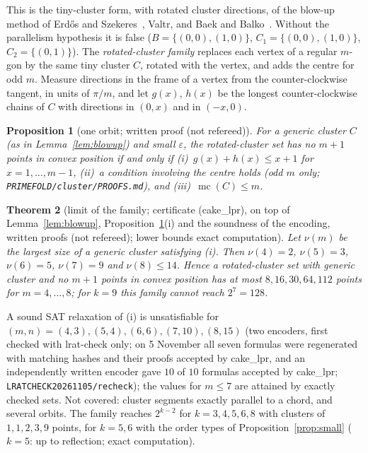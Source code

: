 \documentclass[10pt]{article}
\newtheorem{theorem}{Theorem}[section]
\newtheorem{proposition}[theorem]{Proposition}
\theoremstyle{definition}
\theoremstyle{remark}
\newcommand{\mc}{\operatorname{mc}}
\newcommand{\dirn}[1]{{\upshape\nolinkurl{#1}}}
\begin{document}
This is the tiny-cluster form, with rotated cluster directions, of the blow-up method of Erd\H{o}s and
Szekeres~\cite{ES61}, Valtr, and Baek and Balko~\cite{BB25}. Without the parallelism hypothesis it is false
($B=\{(0,0),(1,0)\}$, $C_1=\{(0,0),(1,0)\}$, $C_2=\{(0,1)\}$). The \emph{rotated-cluster family} replaces each vertex of a
regular $m$-gon by the same tiny cluster $C$, rotated with the vertex, and adds the centre for odd $m$. Measure
directions in the frame of a vertex from the counter-clockwise tangent, in units of $\pi/m$, and let $g(x)$, $h(x)$ be the
longest counter-clockwise chains of $C$ with directions in $(0,x)$ and in $(-x,0)$.

\begin{proposition}[one orbit; written proof (not refereed)]\label{prop:orbit}
For a generic cluster $C$ (as in Lemma~\ref{lem:blowup}) and small $\varepsilon$, the rotated-cluster set has no $m+1$
points in convex position if and only if (i)~$g(x)+h(x)\le x+1$ for $x=1,\dots,m-1$, (ii)~a condition involving the
centre holds (odd $m$ only; \dirn{PRIMEFOLD/cluster/PROOFS.md}), and (iii)~$\mc(C)\le m$.
\end{proposition}

\begin{theorem}[limit of the family; certificate (cake\_lpr), on top of Lemma~\ref{lem:blowup},
Proposition~\ref{prop:orbit}(i) and the soundness of the encoding, written proofs (not refereed); lower bounds exact
computation]\label{thm:E}
Let $\nu(m)$ be the largest size of a generic cluster satisfying (i). Then $\nu(4)=2$, $\nu(5)=3$, $\nu(6)=5$, $\nu(7)=9$
and $\nu(8)\le14$. Hence a rotated-cluster set with generic cluster and no $m+1$ points in convex position has at most
$8,16,30,64,112$ points for $m=4,\dots,8$; for $k=9$ this family cannot reach $2^7=128$.
\end{theorem}

A sound SAT relaxation of (i) is unsatisfiable for $(m,n)=(4,3),(5,4),(6,6),(7,10),(8,15)$ (two encoders, first checked
with lrat-check only; on 5 November all seven formulas were regenerated with matching hashes and their proofs accepted by
cake\_lpr, and an independently written encoder gave $10$ of $10$ formulas accepted by cake\_lpr;
\dirn{LRATCHECK20261105/recheck}); the values for $m\le7$ are attained by exactly checked sets. Not covered:
cluster segments exactly parallel to a chord, and several orbits. The family reaches $2^{k-2}$ for $k=3,4,5,6,8$ with
clusters of $1,1,2,3,9$ points, for $k=5,6$ with the order types of Proposition~\ref{prop:small} ($k=5$: up to
reflection; exact computation).
\end{document}
